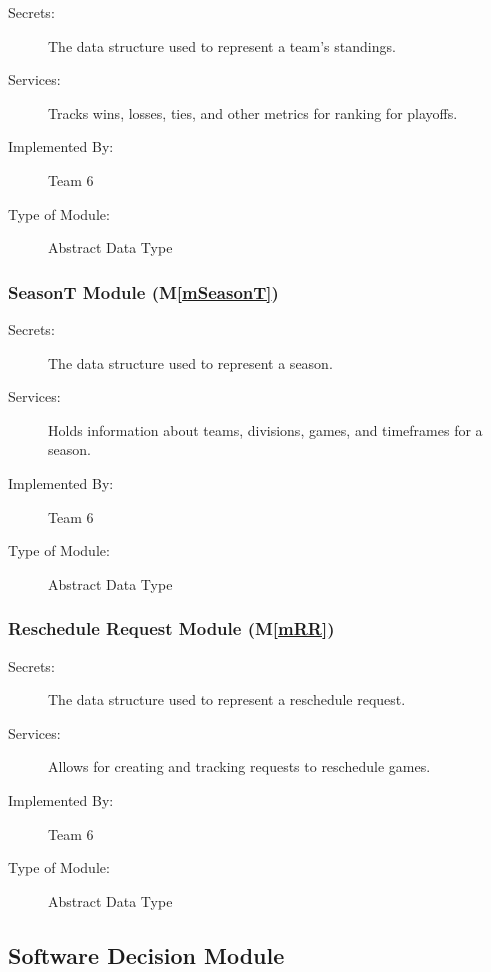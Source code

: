 \documentclass[12pt, titlepage]{article}
\newcommand{\mref}[1]{M\ref{#1}}
\begin{document}
\begin{description}
  \item[Secrets:] The data structure used to represent a team's standings.
  \item[Services:] Tracks wins, losses, ties, and other metrics for ranking for playoffs.
  \item[Implemented By:] Team 6
  \item[Type of Module:] Abstract Data Type
\end{description}

\subsubsection{SeasonT Module (\mref{mSeasonT})}

\begin{description}
  \item[Secrets:] The data structure used to represent a season.
  \item[Services:] Holds information about teams, divisions, games, and timeframes for a season.
  \item[Implemented By:] Team 6
  \item[Type of Module:] Abstract Data Type
\end{description}

\subsubsection{Reschedule Request Module (\mref{mRR})}

\begin{description}
  \item[Secrets:] The data structure used to represent a reschedule request.
  \item[Services:] Allows for creating and tracking requests to reschedule games.
  \item[Implemented By:] Team 6
  \item[Type of Module:] Abstract Data Type
\end{description}


\subsection{Software Decision Module}

\end{document}
